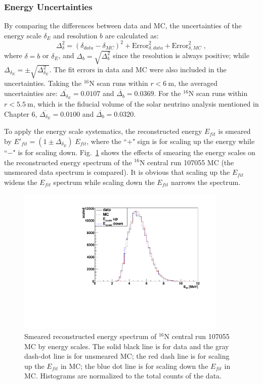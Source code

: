 \subsubsection{Energy Uncertainties}\label{sect:eneryUncertianties}

By comparing the differences between data and MC, the uncertainties of the energy scale $\delta_E$ and resolution $b$ are calculated as:
\begin{equation}
\Delta^2_{\delta}= (\delta_{data}-\delta_{MC})^2+\mathrm{Error}^2_{\delta,data}+\mathrm{Error}^2_{\delta,MC}\; ,
\end{equation}
where $\delta=b$ or $\delta_E$, and $\Delta_b=\sqrt{\Delta^2_{b}}$ since the resolution is always positive; while $\Delta_{\delta_E}=\pm\sqrt{\Delta^2_{\delta_E}}$. The fit errors in data and MC were also included in the uncertainties. Taking the $^{16}$N scan runs within $r<6~$m, the averaged uncertainties are: $\overline{\Delta_{\delta_E}}=0.0107$ and $\overline{\Delta_{b}}=0.0369$. For the $^{16}$N scan runs within $r<5.5~\mathrm{m}$, which is the fiducial volume of the solar neutrino analysis mentioned in Chapter 6, $\overline{\Delta_{\delta_E}}=0.0100$ and $\overline{\Delta_{b}}=0.0320$.

To apply the energy scale systematics, the reconstructed energy $E_{fit}$ is smeared by $E'_{fit}=(1\pm\Delta_{\delta_E}) \; E_{fit}$, where the ``$+$" sign is for scaling up the energy while ``$-$" is for scaling down. Fig.~\ref{fig:EscaleSmear} shows the effects of smearing the energy scales on the reconstructed energy spectrum of the $^{16}$N central run 107055 MC (the unsmeared data spectrum is compared). It is obvious that scaling up the $E_{fit}$ widens the $E_{fit}$ spectrum while scaling down the $E_{fit}$ narrows the spectrum. 

\begin{figure}
	\centering
	\includegraphics[width=10cm]{SmearedEscale_N16.pdf}
	\caption[Smeared reconstructed energy spectrum of $^{16}$N central run 107055 MC by energy scales.]{Smeared reconstructed energy spectrum of $^{16}$N central run 107055 MC by energy scales. The solid black line is for data and the gray dash-dot line is for unsmeared MC; the red dash line is for scaling up the $E_{fit}$ in MC; the blue dot line is for scaling down the $E_{fit}$ in MC. Histograms are normalized to the total counts of the data.\label{fig:EscaleSmear}}
\end{figure}

